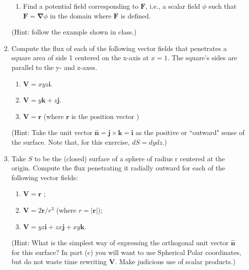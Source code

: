 \documentclass[fleqn]{article}
\begin{document}
\begin{enumerate}
\begin{enumerate}
        \item Find a potential field corresponding to $\mathbf{F}$, i.e., a scalar field $\phi$ such that $\mathbf{F}=\mathbf{\nabla}\phi$ in the domain where $\mathbf{F}$ is defined. 
      \end{enumerate}
      (Hint: follow the example shown in class.)


    \item Compute the flux of each of the following vector fields that penetrates a square area
    of side 1 centered on the x-axis at $x=1$. The square's sides are parallel to the y- and z-axes.
      \begin{enumerate}
        \item $\mathbf{V}=xyz\mathbf{i}$.
        \item $\mathbf{V}=y\mathbf{k}+z\mathbf{j}$.
        \item $\mathbf{V}=\mathbf{r}$ (where $\mathbf{r}$ is the position vector )
      \end{enumerate}
      (Hint: Take the unit vector $\mathbf{\hat n}=\mathbf{j} \times \mathbf{k} = \mathbf{i}$ as the positive or ``outward" sense of the surface. Note that, for this exercise, $dS=dy dz$.)


    \item Take $S$ to be the (closed) surface of a sphere of radius r centered at the origin. Compute the flux penetrating it radially outward for each of the following vector fields:
      \begin{enumerate}
        \item $\mathbf{V}=\mathbf{r}$ ;
        \item $\mathbf{V}=2 \mathbf{r}/r^3$ (where $r=|\mathbf{r}|$); 
        \item $\mathbf{V}=yz\mathbf{i}+zx\mathbf{j}+xy\mathbf{k}$.
      \end{enumerate}
      (Hint: What is the simplest way of expressing the orthogonal unit vector $\mathbf{\hat n}$ for this surface? In part (c) you will want to use Spherical Polar coordinates, but do not waste time rewriting $\mathbf{V}$. Make judicious use of scalar products.)

  \end{enumerate}
\end{document}
